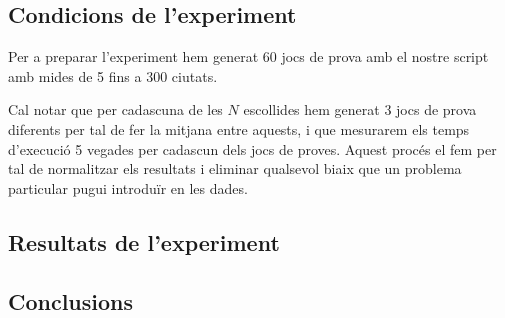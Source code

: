 \documentclass[11pt,a4paper]{article}
\begin{document}
\subsection{Condicions de l'experiment}

Per a preparar l'experiment hem generat 60 jocs de prova amb el nostre script amb mides de 5 fins a 300 ciutats. 

Cal notar que per cadascuna de les $N$ escollides hem generat 3 jocs de prova diferents per tal de fer la mitjana entre aquests, i que mesurarem els temps d'execució 5 vegades per cadascun dels jocs de proves. Aquest procés el fem per tal de normalitzar els resultats i eliminar qualsevol biaix que un problema particular pugui introduïr en les dades.

\subsection{Resultats de l'experiment}



\subsection{Conclusions}
\end{document}
